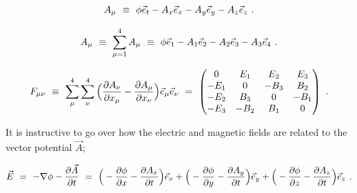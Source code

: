 \documentclass{article}
\begin{document}
\begin{equation} \label{eq:1002}
A_{\mu} \hspace{0.125cm} \equiv \hspace{0.125cm} \phi \vec{e}_t - A_x \vec{e}_x - A_y \vec{e}_y - A_z \vec{e}_z \hspace{0.125cm} .
\end{equation}

\begin{equation} \label{eq:1002}
A_{\mu} \hspace{0.125cm} \equiv \hspace{0.125cm} \sum_{\mu = 1}^{4} A_{\mu} \hspace{0.125cm} \equiv \hspace{0.125cm} \phi \vec{e}_1 - A_1 \vec{e}_2 - A_2 \vec{e}_3 - A_3 \vec{e}_4 \hspace{0.125cm} .
\end{equation}

\begin{equation} \label{eq:1002}
F_{\mu \nu} \hspace{0.125cm} \equiv \hspace{0.125cm}  \sum_{\mu}^{4} \sum_{\nu}^{4} \Big( \frac{\partial{A_{\nu}}}{\partial{x_{\mu}}} - \frac{\partial{A_{\mu}}}{\partial{x_{\nu}}} \Big) \vec{e}_{\mu} \vec{e}_{\nu} \hspace{0.125cm} = \hspace{0.125cm} \begin{pmatrix} 0 & E_1 & E_2 & E_3 \\ -E_1 & 0 & -B_3 & B_2 \\ -E_2 & B_3 & 0 & -B_1 \\ -E_3 & -B_2 & B_1 & 0 \end{pmatrix} \hspace{0.125cm} .
\end{equation}

It is instructive to go over how the electric and magnetic fields are related to the vector potential \begin{math} \vec{A} \end{math};

\begin{equation} \label{eq:1002}
\vec{E} \hspace{0.125cm} = \hspace{0.125cm} - \nabla{\phi} - \frac{\partial{\vec{A}}}{\partial{t}} \hspace{0.125cm} = \hspace{0.125cm} \Big( - \frac{\partial{\phi}}{\partial{x}} - \frac{\partial{A_x}}{\partial{t}} \Big) \vec{e}_x + \Big( - \frac{\partial{\phi}}{\partial{y}} - \frac{\partial{A_y}}{\partial{t}} \Big) \vec{e}_y + \Big( - \frac{\partial{\phi}}{\partial{z}} - \frac{\partial{A_z}}{\partial{t}} \Big) \vec{e}_z \hspace{0.125cm} .
\end{equation}
\end{document}
